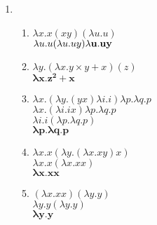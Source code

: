 \documentclass{../sftex/sftex}
\begin{document}
\begin{enumerate}
    \item
    \begin{enumerate}
        \item $\lambda x.x(xy)(\lambda u.u)$ \\
            $\lambda u.u(\lambda u.uy) \\
            \mathbf{\lambda u.uy}$
        \item $\lambda y.(\lambda x.y \times y + x)(z)$ \\
            $\mathbf{\lambda x.z^2 + x}$
        \item $\lambda x.(\lambda y.(yx)\lambda i.i)\lambda p.\lambda q.p$ \\
            $\lambda x.(\lambda i.i x)\lambda p.\lambda q.p$ \\
            $\lambda i.i(\lambda p.\lambda q.p)$ \\
            $\mathbf{\lambda p.\lambda q.p}$
        \item $\lambda x.x(\lambda y.(\lambda x.xy)x)$ \\
            $\lambda x.x(\lambda x.xx)$ \\
            $\mathbf{\lambda x.xx}$
        \item $(\lambda x.xx)(\lambda y.y)$ \\
            $\lambda y.y(\lambda y.y)$ \\
            $\mathbf{\lambda y.y}$
    \end{enumerate}
\end{enumerate}
\end{document}
